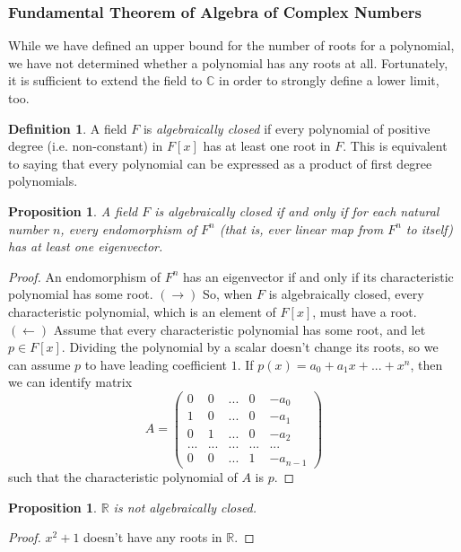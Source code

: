 \documentclass{article}
\newtheorem{proposition}[theorem]{Proposition}
\theoremstyle{remark}
\theoremstyle{definition}
\newtheorem{definition}{Definition}[section]
\begin{document}
\subsubsection{Fundamental Theorem of Algebra of Complex Numbers}
While we have defined an upper bound for the number of roots for a polynomial, we have not determined whether a polynomial has any roots at all. Fortunately, it is sufficient to extend the field to $\mathbb{C}$ in order to strongly define a lower limit, too. 

\begin{definition}
A field $F$ is \textit{algebraically closed} if every polynomial of positive degree (i.e. non-constant) in $F[x]$ has at least one root in $F$. This is equivalent to saying that every polynomial can be expressed as a product of first degree polynomials.
\end{definition}

\begin{proposition}
A field $F$ is algebraically closed if and only if for each natural number $n$, every endomorphism of $F^n$ (that is, ever linear map from $F^n$ to itself) has at least one eigenvector. 
\end{proposition}
\begin{proof}
An endomorphism of $F^n$ has an eigenvector if and only if its characteristic polynomial has some root. $(\rightarrow)$ So, when $F$ is algebraically closed, every characteristic polynomial, which is an element of $F[x]$, must have a root. $(\leftarrow)$ Assume that every characteristic polynomial has some root, and let $p \in F[x]$. Dividing the polynomial by a scalar doesn't change its roots, so we can assume $p$ to have leading coefficient $1$. If $p(x) = a_0 + a_1 x + ... + x^n$, then we can identify matrix 
\[A = \begin{pmatrix}
0 & 0 & ... & 0 & -a_0 \\
1 & 0 & ... & 0 & -a_1 \\
0 & 1 & ... & 0 & -a_2 \\
... & ... & ... & ... & ... \\
0 & 0 & ... & 1 & -a_{n-1}
\end{pmatrix}\]
such that the characteristic polynomial of $A$ is $p$. 
\end{proof}

\begin{proposition}
$\mathbb{R}$ is not algebraically closed. 
\end{proposition}
\begin{proof}
$x^2 + 1$ doesn't have any roots in $\mathbb{R}$. 
\end{proof}
\end{document}
